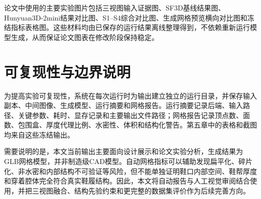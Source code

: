 论文中使用的主要实验图片包括三视图输入证据图、SF3D基线结果图、Hunyuan3D-2mini结果对比图、S1--S4综合对比图、生成网格预览横向对比图和冻结指标表格图。这些材料均由已保存的运行结果离线整理得到，不依赖重新运行模型生成，从而保证论文图表在修改阶段保持稳定。

\section{可复现性与边界说明}

为提高实验可复现性，系统在每次运行时为输出建立独立的运行目录，并保存输入副本、中间图像、生成模型、运行摘要和网格报告。运行摘要记录后端、输入路径、关键参数、耗时、显存记录和主要输出文件路径；网格报告记录顶点数、面数、包围盒、厚度代理比例、水密性、体积和结构化警告。第五章中的表格和截图均来自这些冻结输出。

需要说明的是，本文当前输出主要面向设计展示和论文实验分析，生成结果为GLB网格模型，并非制造级CAD模型。自动网格指标可以辅助发现扁平化、碎片化、非水密和内部结构不可验证等风险，但不能单独证明鞋口内部空间、鞋帮厚度和穿着腔体完全符合真实鞋履结构。因此，本文将自动报告与人工视觉审阅结合使用，并把三视图融合、结构先验约束和更完整的数据集评价作为后续完善方向。
